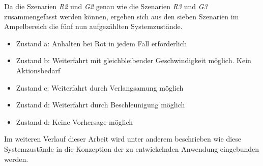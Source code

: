 Da die Szenarien \textit{R2} und \textit{G2} genau wie die Szenarien \textit{R3} und \textit{G3} zusammengefasst werden können, ergeben sich aus den sieben Szenarien im Ampelbereich die fünf nun aufgezählten Systemzustände.
\begin{itemize}
	\item Zustand a: Anhalten bei Rot in jedem Fall erforderlich
	\item Zustand b: Weiterfahrt mit gleichbleibender Geschwindigkeit möglich. Kein Aktionsbedarf
	\item Zustand c: Weiterfahrt durch Verlangsamung möglich
	\item Zustand d: Weiterfahrt durch Beschleunigung möglich
	\item Zustand d: Keine Vorhersage möglich
\end{itemize}
Im weiteren Verlauf dieser Arbeit wird unter anderem beschrieben wie diese Systemzustände in die Konzeption der zu entwickelnden Anwendung eingebunden werden.
